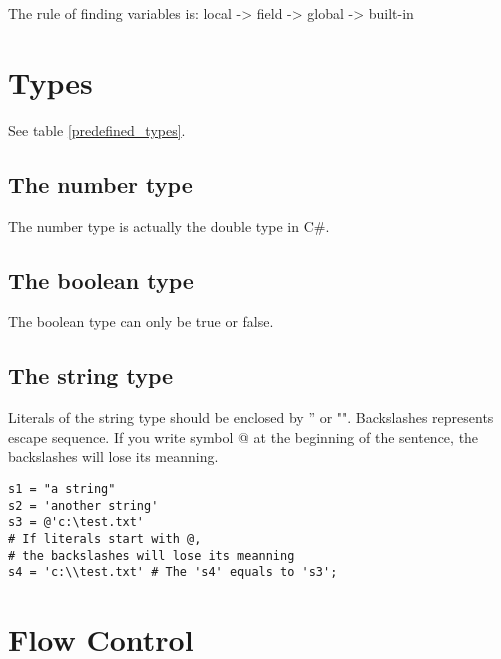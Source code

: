 The rule of finding variables is: local -> field -> global -> built-in

\section{Types}
See table \ref{predefined_types}.
\begin{table}
	\label{predefined_types}
	\caption{Predefined Types}
\end{table}

\subsection{The number type}
The number type is actually the double type in C\#.
\subsection{The boolean type}
The boolean type can only be true or false.
\subsection{The string type}
Literals of the string type should be enclosed by '' or "". Backslashes represents escape sequence. If you write symbol @ at the beginning of the sentence, the backslashes will lose its meanning.
\begin{lstlisting}
s1 = "a string"
s2 = 'another string'
s3 = @'c:\test.txt' 
# If literals start with @, 
# the backslashes will lose its meanning
s4 = 'c:\\test.txt' # The 's4' equals to 's3';
\end{lstlisting}

\section{Flow Control}
